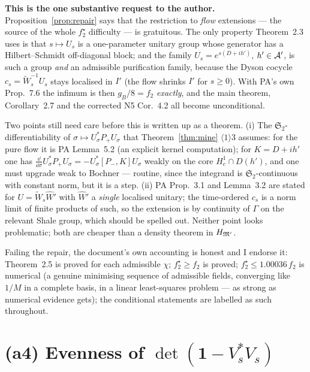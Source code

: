 \documentclass[11pt]{article}
\newcommand{\Wt}{\widetilde W}\newcommand{\kt}{\widetilde k}
\newcommand{\Stwo}{\mathfrak S_2}\newcommand{\Sone}{\mathfrak S_1}
\newcommand{\Pp}{P_+}\newcommand{\Pm}{P_-}\newcommand{\Om}{\Omega}\newcommand{\one}{\mathbf 1}
\begin{document}
\begin{verdictgap}
\textbf{This is the one substantive request to the author.}  Proposition~\ref{prop:repair} says that
the restriction to \emph{flow} extensions --- the source of the whole $f_2^\star$ difficulty --- is
gratuitous.  The only property Theorem~2.3 uses is that $s\mapsto U_s$ is a one-parameter unitary
group whose generator has a Hilbert--Schmidt off-diagonal block; and the family
$U_s=e^{s(D+ih')}$, $h'\in\mathcal A'$, is such a group \emph{and} an admissible purification family,
because the Dyson cocycle $c_s=\Wt_s^{-1}U_s$ stays localised in $I'$ (the flow shrinks $I'$ for
$s\ge0$).  With PA's own Prop.~7.6 the infimum is then $g_B/8=f_2$ \emph{exactly}, and the main
theorem, Corollary~2.7 and the corrected N5 Cor.~4.2 all become unconditional.

Two points still need care before this is written up as a theorem.  (i) The
$\Stwo$-differentiability of $\sigma\mapsto U_\sigma^*\Pp U_\sigma$ that Theorem~\ref{thm:mine}
$\langle1\rangle3$ assumes: for the pure flow it is PA Lemma~5.2 (an explicit kernel computation);
for $K=D+ih'$ one has $\frac{\dd}{\dd\sigma}U_\sigma^*\Pp U_\sigma=-U_\sigma^*[\Pm,K]U_\sigma$
weakly on the core $H^1_c\cap D(h')$, and one must upgrade weak to Bochner --- routine, since the
integrand is $\Stwo$-continuous with constant norm, but it is a step.  (ii) PA Prop.~3.1 and
Lemma~3.2 are stated for $U=\Wt_s\widehat W'$ with $\widehat W'$ a \emph{single} localised unitary;
the time-ordered $c_s$ is a norm limit of finite products of such, so the extension is by continuity
of $\Gamma$ on the relevant Shale group, which should be spelled out.  Neither point looks
problematic; both are cheaper than a density theorem in $H_{\mathfrak M'}$.
\end{verdictgap}

\begin{verdictok}
Failing the repair, the document's own accounting is honest and I endorse it: Theorem~2.5 is proved
for each admissible $\chi$; $f_2^\star\ge f_2$ is proved; $f_2^\star\le1.00036\,f_2$ is numerical
(a genuine minimising sequence of admissible fields, converging like $1/M$ in a complete basis, in
a linear least-squares problem --- as strong as numerical evidence gets); the conditional
statements are labelled as such throughout.
\end{verdictok}

\section{(a4) Evenness of $\det(\one-V_s^*V_s)$}\label{sec:even}
\end{document}
